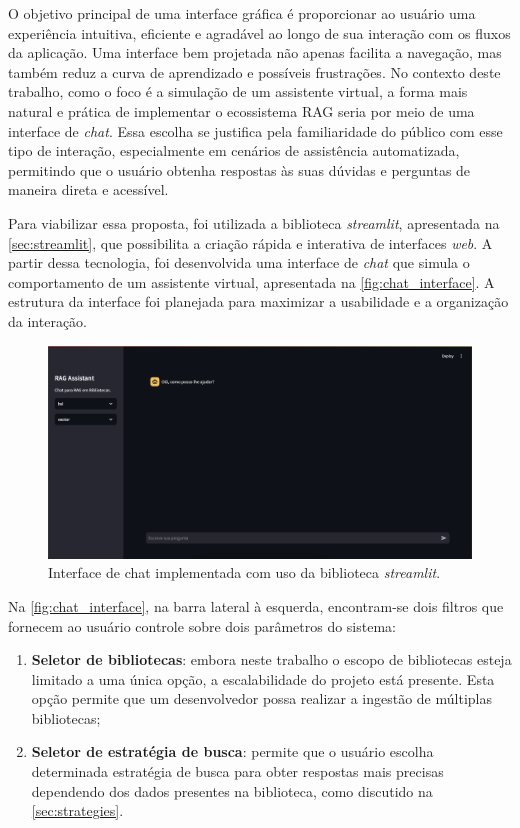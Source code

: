 \documentclass[a4paper, 12pt]{article}
\begin{document}
    O objetivo principal de uma interface gráfica é proporcionar ao usuário uma experiência intuitiva, eficiente e agradável ao longo de sua interação com os fluxos da aplicação. Uma interface bem projetada não apenas facilita a navegação, mas também reduz a curva de aprendizado e possíveis frustrações. No contexto deste trabalho, como o foco é a simulação de um assistente virtual, a forma mais natural e prática de implementar o ecossistema RAG seria por meio de uma interface de \textit{chat}. Essa escolha se justifica pela familiaridade do público com esse tipo de interação, especialmente em cenários de assistência automatizada, permitindo que o usuário obtenha respostas às suas dúvidas e perguntas de maneira direta e acessível.

    Para viabilizar essa proposta, foi utilizada a biblioteca \textit{streamlit}, apresentada na \autoref{sec:streamlit}, que possibilita a criação rápida e interativa de interfaces \textit{web}. A partir dessa tecnologia, foi desenvolvida uma interface de \textit{chat} que simula o comportamento de um assistente virtual, apresentada na \autoref{fig:chat_interface}. A estrutura da interface foi planejada para maximizar a usabilidade e a organização da interação.
    
    \begin{figure}[ht]
        \includegraphics[width=\textwidth,height=0.9\textheight,keepaspectratio]{chat-interface.png}
        \centering
        \caption{Interface de chat implementada com uso da biblioteca \textit{streamlit}.}
        \centering
        \label{fig:chat_interface}
    \end{figure}

    Na \autoref{fig:chat_interface}, na barra lateral à esquerda, encontram-se dois filtros que fornecem ao usuário controle sobre dois parâmetros do sistema: 
    
    \begin{enumerate}
        \item \textbf{Seletor de bibliotecas}: embora neste trabalho o escopo de bibliotecas esteja limitado a uma única opção, a escalabilidade do projeto está presente. Esta opção permite que um desenvolvedor possa realizar a ingestão de múltiplas bibliotecas;
        \item \textbf{Seletor de estratégia de busca}: permite que o usuário escolha determinada estratégia de busca para obter respostas mais precisas dependendo dos dados presentes na biblioteca, como discutido na \autoref{sec:strategies}.
    \end{enumerate}
    
\end{document}
